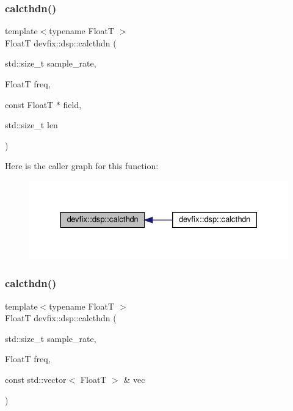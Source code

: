 \mbox{\label{namespacedevfix_1_1dsp_a1982c6b562b8c196dd3322c207c0ac86}} 
\subsubsection{\texorpdfstring{calcthdn()}{calcthdn()}\hspace{0.1cm}{\footnotesize\ttfamily [1/3]}}
{\footnotesize\ttfamily template$<$typename FloatT $>$ \\
FloatT devfix\+::dsp\+::calcthdn (\begin{DoxyParamCaption}\item[{std\+::size\+\_\+t}]{sample\+\_\+rate,  }\item[{FloatT}]{freq,  }\item[{const FloatT $\ast$}]{field,  }\item[{std\+::size\+\_\+t}]{len }\end{DoxyParamCaption})}

Here is the caller graph for this function\+:
\nopagebreak
\begin{figure}[H]
\begin{center}
\leavevmode
\includegraphics[width=330pt]{namespacedevfix_1_1dsp_a1982c6b562b8c196dd3322c207c0ac86_icgraph}
\end{center}
\end{figure}
\mbox{\label{namespacedevfix_1_1dsp_a424b6903cca9ea1aebfa4712ea070a1e}} 
\subsubsection{\texorpdfstring{calcthdn()}{calcthdn()}\hspace{0.1cm}{\footnotesize\ttfamily [2/3]}}
{\footnotesize\ttfamily template$<$typename FloatT $>$ \\
FloatT devfix\+::dsp\+::calcthdn (\begin{DoxyParamCaption}\item[{std\+::size\+\_\+t}]{sample\+\_\+rate,  }\item[{FloatT}]{freq,  }\item[{const std\+::vector$<$ FloatT $>$ \&}]{vec }\end{DoxyParamCaption})}

